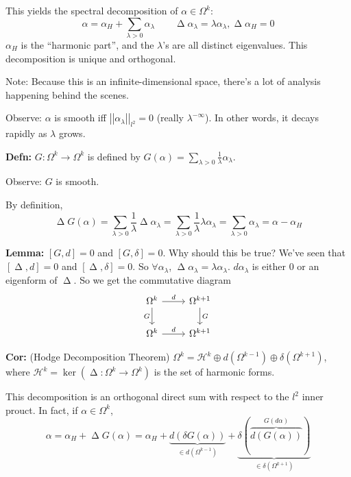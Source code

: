 \documentclass[10pt,letterpaper]{article}
\newcommand{\n}{\hfill\break}
\newcommand{\nn}{\vspace{0.5\baselineskip}\n}
\newcommand{\hangblock}[2]{\par\noindent\settowidth{\hangindent}{\textbf{#1: }}\textbf{#1: }\nolinebreak#2}
\newcommand{\lemma}[1]{\hangblock{Lemma}{#1}}
\newcommand{\defn}[1]{\hangblock{Defn}{#1}}
\newcommand{\cor}[1]{\hangblock{Cor}{#1}}
\newcommand{\comm}[1]{\left[#1\right]}
\DeclareMathOperator{\Laplacian}{\Delta}
\newcommand{\abs}[1]{\left|#1\right|}
\newcommand{\norm}[1]{\abs{\abs{#1}}}
\newcommand{\mc}[1]{\mathcal{#1}}
\begin{document}
\par\noindent
This yields the spectral decomposition of $\alpha\in\Omega^{k}$:
\[
	\alpha=\alpha_{H}+\sum_{\lambda>0}\alpha_{\lambda}\qquad\Laplacian\alpha_{\lambda}=\lambda\alpha_{\lambda},\Laplacian\alpha_{H}=0
\]
$\alpha_{H}$ is the ``harmonic part'', and the $\lambda$'s are all distinct eigenvalues. This decomposition is unique and orthogonal.\n

\par\noindent
Note: Because this is an infinite-dimensional space, there's a lot of analysis happening behind the scenes.\n

\par\noindent
Observe: $\alpha$ is smooth iff $\norm{\alpha_{\lambda}}_{l^{2}}=0$ (really $\lambda^{-\infty}$). In other words, it decays rapidly as $\lambda$ grows.\n

\defn{
	$G:\Omega^{k}\to\Omega^{k}$ is defined by $G(\alpha)=\sum_{\lambda>0}\frac{1}{\lambda}\alpha_{\lambda}$.\n
}

\par\noindent
Observe: $G$ is smooth.\n

\par\noindent
By definition,
\[
	\Laplacian{}G(\alpha)=\sum_{\lambda>0}\frac{1}{\lambda}\Laplacian\alpha_{\lambda}=\sum_{\lambda>0}\frac{1}{\lambda}\lambda\alpha_{\lambda}=\sum_{\lambda>0}\alpha_{\lambda}=\alpha-\alpha_{H}
\]

\lemma{
	$\comm{G,d}=0$ and $\comm{G,\delta}=0$.\nn
	Why should this be true? We've seen that $\comm{\Laplacian,d}=0$ and $\comm{\Laplacian,\delta}=0$. So $\forall\alpha_{\lambda}$, $\Laplacian\alpha_{\lambda}=\lambda\alpha_{\lambda}$. $d\alpha_{\lambda}$ is either $0$ or an eigenform of $\Laplacian$. So we get the commutative diagram
	\[
		\begin{tikzcd}[ampersand replacement=\&]
			\Omega^{k} \arrow[r, "d"] \arrow[d, "G"'] \& \Omega^{k+1} \arrow[d, "G"]\\
			\Omega^{k} \arrow[r, "d"] \& \Omega^{k+1}
		\end{tikzcd}
	\]
}

\cor{
	(Hodge Decomposition Theorem) $\Omega^{k}=\mc{H}^{k}\oplus{}d(\Omega^{k-1})\oplus\delta(\Omega^{k+1})$, where $\mc{H}^{k}=\ker(\Laplacian:\Omega^{k}\to\Omega^{k})$ is the set of harmonic forms.\n
}

\par\noindent
This decomposition is an orthogonal direct sum with respect to the $l^{2}$ inner prouct. In fact, if $\alpha\in\Omega^{k}$,
\[
	\alpha=\alpha_{H}+\Laplacian{}G(\alpha)=\alpha_{H}+\underbrace{d(\delta{}G(\alpha))}_{\in{}d(\Omega^{k-1})}+\underbrace{\delta(\overbrace{d(G(\alpha))}^{G(d\alpha)})}_{\in{}\delta(\Omega^{k+1})}
\]
\end{document}
